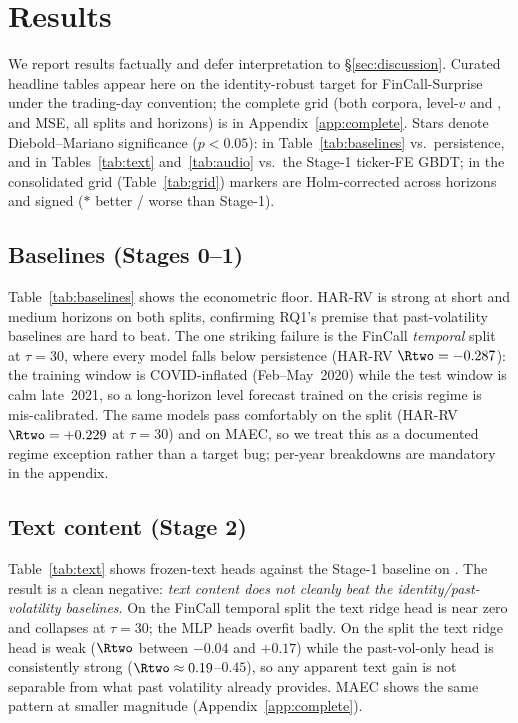 \section{Results}
\label{sec:results}

We report results factually and defer interpretation to \S\ref{sec:discussion}.
Curated headline tables appear here on the identity-robust \dv{} target for
FinCall-Surprise under the trading-day convention; the complete grid (both corpora,
level-$v$ and \dv, \Rtwo{} and MSE, all splits and horizons) is in
Appendix~\ref{app:complete}. Stars denote Diebold--Mariano significance
($p<0.05$): in Table~\ref{tab:baselines} vs.\ persistence, and in
Tables~\ref{tab:text} and~\ref{tab:audio} vs.\ the Stage-1 ticker-FE GBDT; in the
consolidated grid (Table~\ref{tab:grid}) markers are Holm-corrected across horizons
and signed ($*$ better / \dag{} worse than Stage-1).

\subsection{Baselines (Stages 0--1)}
Table~\ref{tab:baselines} shows the econometric floor. HAR-RV is strong at short and
medium horizons on both splits, confirming RQ1's premise that past-volatility
baselines are hard to beat. The one striking failure is the FinCall \emph{temporal}
split at $\tau{=}30$, where every model falls below persistence (HAR-RV
$\Rtwo=-0.287$): the training window is COVID-inflated (Feb--May~2020) while the
test window is calm late~2021, so a long-horizon level forecast trained on the
crisis regime is mis-calibrated. The same models pass comfortably on the
\tickerdisjoint{} split (HAR-RV $\Rtwo=+0.229$ at $\tau{=}30$) and on MAEC, so we
treat this as a documented regime exception rather than a target bug; per-year
breakdowns are mandatory in the appendix.



\subsection{Text content (Stage 2)}
Table~\ref{tab:text} shows frozen-text heads against the Stage-1 baseline on \dv.
The result is a clean negative: \emph{text content does not cleanly beat the
identity/past-volatility baselines}. On the FinCall temporal split the text ridge
head is near zero and collapses at $\tau{=}30$; the MLP heads overfit badly. On the
\tickerdisjoint{} split the text ridge head is weak ($\Rtwo$ between $-0.04$ and
$+0.17$) while the past-vol-only head is consistently strong
($\Rtwo\approx0.19$--$0.45$), so any apparent text gain is not separable from what
past volatility already provides. MAEC shows the same pattern at smaller magnitude
(Appendix~\ref{app:complete}).

